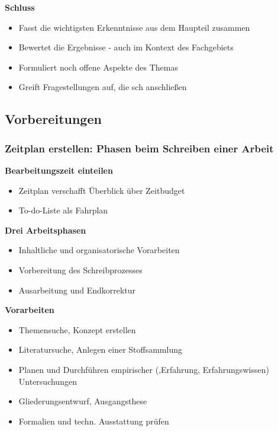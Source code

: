 \textbf{Schluss}

\begin{itemize}%
\item
  Fasst die wichtigsten Erkenntnisse aus dem Haupteil zusammen
\item
  Bewertet die Ergebnisse - auch im Kontext des Fachgebiets
\item
  Formuliert noch offene Aspekte des Themas
\item
  Greift Fragestellungen auf, die sch anschließen
\end{itemize}

\subsection{Vorbereitungen}\label{vorbereitungen}

\subsubsection{Zeitplan erstellen: Phasen beim Schreiben einer
Arbeit}\label{zeitplan-erstellen-phasen-beim-schreiben-einer-arbeit}

\textbf{Bearbeitungszeit einteilen}

\begin{itemize}%
\item
  Zeitplan verschafft Überblick über Zeitbudget
\item
  To-do-Liste als Fahrplan
\end{itemize}

\textbf{Drei Arbeitsphasen}

\begin{itemize}%
\item
  Inhaltliche und organisatorische Vorarbeiten
\item
  Vorbereitung des Schreibprozesses
\item
  Ausarbeitung und Endkorrektur
\end{itemize}

\textbf{Vorarbeiten}

\begin{itemize}%
\item
  Themensuche, Konzept erstellen
\item
  Literatursuche, Anlegen einer Stoffsammlung
\item
  Planen und Durchführen empirischer (‚Erfahrung, Erfahrungswissen)
  Untersuchungen
\item
  Gliederungsentwurf, Ausgangsthese
\item
  Formalien und techn. Ausstattung prüfen
\end{itemize}

